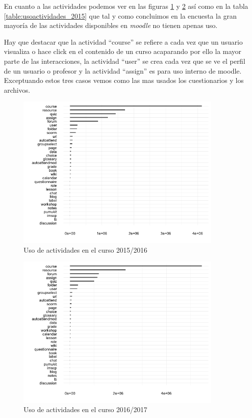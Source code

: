 En cuanto a las actividades podemos ver en las figuras \ref{fig:usoactividades_2015} y \ref{fig:usoactividades_2016} así como en la tabla \ref{table:usoactividades_2015} que tal y como concluimos en la encuesta la gran mayoría de las actividades disponibles en \textit{moodle} no tienen apenas uso.

\bigskip
Hay que destacar que la actividad ``course'' se refiere a cada vez que un usuario visualiza o hace click en el contenido de un curso acaparando por ello la mayor parte de las interacciones, la actividad ``user'' se crea cada vez que se ve el perfil de un usuario o profesor y la actividad ``assign'' es para uso interno de moodle. Exceptuando estos tres casos vemos como las mas usados los cuestionarios y los archivos.

\begin{figure}[H]
\centering
\includegraphics[width=0.9\textwidth]{../r/usoactividades_2015}
\caption{Uso de actividades en el curso 2015/2016}
\label{fig:usoactividades_2015}
\end{figure}

\begin{figure}[H]
\centering
\includegraphics[width=0.9\textwidth]{../r/usoactividades_2016}
\caption{Uso de actividades en el curso 2016/2017}
\label{fig:usoactividades_2016}
\end{figure}

